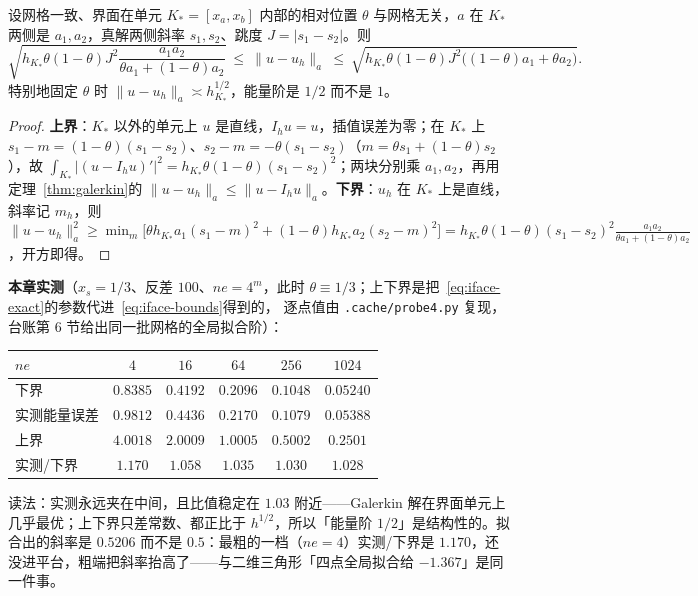 \begin{theorem}[能量误差的两个界]
\label{thm:iface}
设网格一致、界面在单元 $K_*=[x_a,x_b]$ 内部的相对位置 $\theta$ 与网格无关，$a$ 在 $K_*$ 两侧是 $a_1,a_2$，真解两侧斜率 $s_1,s_2$、跳度
$J=|s_1-s_2|$。则
\begin{equation}
  \sqrt{h_{K_*}\theta(1-\theta)J^2\frac{a_1a_2}{\theta a_1+(1-\theta)a_2}}
  \ \le\ \|u-u_h\|_a\ \le\
  \sqrt{h_{K_*}\theta(1-\theta)J^2\bigl((1-\theta)a_1+\theta a_2\bigr)} .
  \label{eq:iface-bounds}
\end{equation}
特别地固定 $\theta$ 时 $\|u-u_h\|_a\asymp h_{K_*}^{1/2}$，能量阶是 $1/2$ 而不是 $1$。
\end{theorem}
\begin{proof}
\textbf{上界}：$K_*$ 以外的单元上 $u$ 是直线，$I_hu=u$，插值误差为零；在 $K_*$ 上
$s_1-m=(1-\theta)(s_1-s_2)$、$s_2-m=-\theta(s_1-s_2)$（$m=\theta s_1+(1-\theta)s_2$），故
$\int_{K_*}|(u-I_hu)'|^2=h_{K_*}\theta(1-\theta)(s_1-s_2)^2$；两块分别乘
$a_1,a_2$，再用定理~\ref{thm:galerkin}的 $\|u-u_h\|_a\le\|u-I_hu\|_a$。\textbf{下界}：$u_h$ 在 $K_*$
上是直线，斜率记 $m_h$，则 $\|u-u_h\|_a^2\ge\min_m\bigl[\theta
h_{K_*}a_1(s_1-m)^2+(1-\theta)h_{K_*}a_2(s_2-m)^2\bigr]=h_{K_*}\theta(1-\theta)(s_1-s_2)^2\frac{a_1a_2}{\theta
a_1+(1-\theta)a_2}$，开方即得。
\end{proof}

\textbf{本章实测}（$x_s=1/3$、反差 $100$、$ne=4^m$，此时
$\theta\equiv1/3$；上下界是把~\eqref{eq:iface-exact}的参数代进~\eqref{eq:iface-bounds}得到的，
逐点值由 \texttt{.cache/probe4.py} 复现，台账第 6 节给出同一批网格的全局拟合阶）：
\begin{center}
\begin{tabular}{lccccc}
\toprule
$ne$ & $4$ & $16$ & $64$ & $256$ & $1024$ \\
\midrule
下界 & $0.8385$ & $0.4192$ & $0.2096$ & $0.1048$ & $0.05240$ \\
实测能量误差 & $0.9812$ & $0.4436$ & $0.2170$ & $0.1079$ & $0.05388$ \\
上界 & $4.0018$ & $2.0009$ & $1.0005$ & $0.5002$ & $0.2501$ \\
实测/下界 & $1.170$ & $1.058$ & $1.035$ & $1.030$ & $1.028$ \\
\bottomrule
\end{tabular}
\end{center}
读法：实测永远夹在中间，且比值稳定在 $1.03$ 附近——Galerkin 解在界面单元上几乎最优；上下界只差常数、都正比于 $h^{1/2}$，所以「能量阶
$1/2$」是结构性的。拟合出的斜率是 $0.5206$ 而不是 $0.5$：最粗的一档（$ne=4$）实测/下界是
$1.170$，还没进平台，粗端把斜率抬高了——与二维三角形「四点全局拟合给 $-1.367$」是同一件事。

